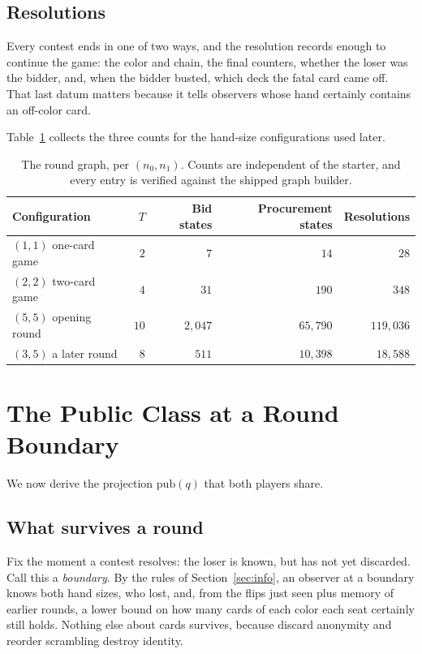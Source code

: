 \documentclass[11pt]{article}
\theoremstyle{plain}
\theoremstyle{definition}
\theoremstyle{remark}
\begin{document}
\subsection{Resolutions}

Every contest ends in one of two ways, and the resolution records enough to
continue the game: the color and chain, the final counters, whether the
loser was the bidder, and, when the bidder busted, which deck the fatal
card came off. That last datum matters because it tells observers whose
hand certainly contains an off-color card.

Table~\ref{tab:round} collects the three counts for the hand-size
configurations used later.

\begin{table}[t]
\centering
\caption{The round graph, per $(n_0,n_1)$. Counts are independent of the
starter, and every entry is verified against the shipped graph builder.}
\label{tab:round}
\begin{tabular}{@{}lrrrr@{}}
\toprule
Configuration & $T$ & Bid states & Procurement states & Resolutions\\
\midrule
$(1,1)$ \quad one-card game & $2$  & $7$     & $14$     & $28$\\
$(2,2)$ \quad two-card game & $4$  & $31$    & $190$    & $348$\\
$(5,5)$ \quad opening round & $10$ & $2{,}047$ & $65{,}790$ & $119{,}036$\\
$(3,5)$ \quad a later round & $8$  & $511$   & $10{,}398$ & $18{,}588$\\
\bottomrule
\end{tabular}
\end{table}

\section{The Public Class at a Round Boundary}\label{sec:public}

We now derive the projection $\mathrm{pub}(q)$ that both players share.

\subsection{What survives a round}

Fix the moment a contest resolves: the loser is known, but has not yet
discarded. Call this a \emph{boundary}. By the rules of
Section~\ref{sec:info}, an observer at a boundary knows both hand sizes,
who lost, and, from the flips just seen plus memory of earlier rounds, a
lower bound on how many cards of each color each seat certainly still
holds. Nothing else about cards survives, because discard anonymity and
reorder scrambling destroy identity.
\end{document}

